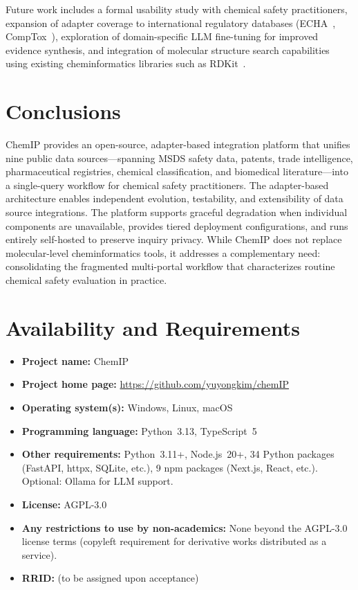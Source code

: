 \documentclass[10pt]{article}
\begin{document}
Future work includes a formal usability study with chemical safety practitioners, expansion of adapter coverage to international regulatory databases (ECHA~\cite{echa}, CompTox~\cite{comptox}), exploration of domain-specific LLM fine-tuning for improved evidence synthesis, and integration of molecular structure search capabilities using existing cheminformatics libraries such as RDKit~\cite{rdkit}.

\section{Conclusions}
\label{sec:conclusions}

ChemIP provides an open-source, adapter-based integration platform that unifies nine public data sources---spanning MSDS safety data, patents, trade intelligence, pharmaceutical registries, chemical classification, and biomedical literature---into a single-query workflow for chemical safety practitioners.
The adapter-based architecture enables independent evolution, testability, and extensibility of data source integrations.
The platform supports graceful degradation when individual components are unavailable, provides tiered deployment configurations, and runs entirely self-hosted to preserve inquiry privacy.
While ChemIP does not replace molecular-level cheminformatics tools, it addresses a complementary need: consolidating the fragmented multi-portal workflow that characterizes routine chemical safety evaluation in practice.

\section*{Availability and Requirements}

\begin{itemize}[nosep]
  \item \textbf{Project name:} ChemIP
  \item \textbf{Project home page:} \url{https://github.com/yuyongkim/chemIP}
  \item \textbf{Operating system(s):} Windows, Linux, macOS
  \item \textbf{Programming language:} Python~3.13, TypeScript~5
  \item \textbf{Other requirements:} Python~3.11+, Node.js~20+, 34 Python packages (FastAPI, httpx, SQLite, etc.), 9 npm packages (Next.js, React, etc.). Optional: Ollama for LLM support.
  \item \textbf{License:} AGPL-3.0
  \item \textbf{Any restrictions to use by non-academics:} None beyond the AGPL-3.0 license terms (copyleft requirement for derivative works distributed as a service).
  \item \textbf{RRID:} (to be assigned upon acceptance)
\end{itemize}
\end{document}
